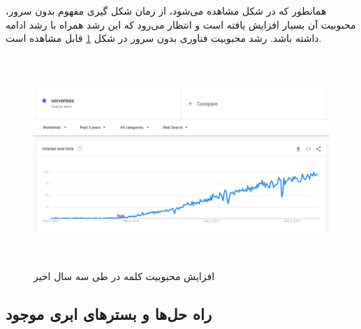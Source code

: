 همانطور که در شکل مشاهده می‌شود، از زمان شکل گیری مفهوم بدون سرور، محبوبیت آن بسیار افزایش یافته است و انتظار می‌رود که این رشد همراه با رشد  ادامه داشته باشد. رشد محبوبیت فناوری بدون سرور در شکل \ref{serverless_google_trends} قابل مشاهده است.

\begin{figure}[!h]
	\centering
	\includegraphics[height=8cm]{images/serverless_google_trends}
	\caption{افزایش محبوبیت کلمه  ‌‌در  طی سه سال اخیر}
	\label{serverless_google_trends}
\end{figure}

\subsection{راه حل‌ها و بسترهای ابری موجود}

